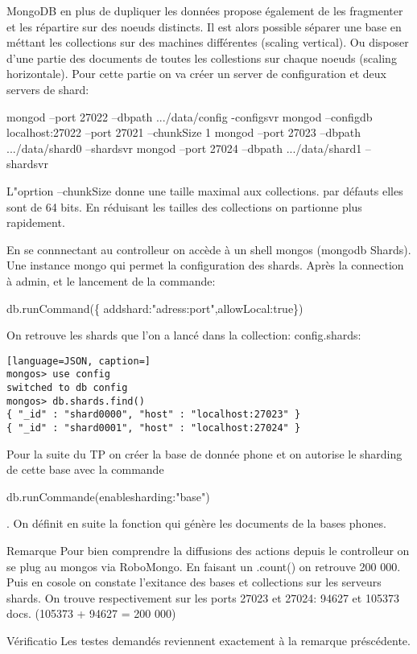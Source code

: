 MongoDB en plus de dupliquer les données propose également de les fragmenter et les répartire sur des noeuds distincts. Il est alors possible séparer une base en méttant les collections sur des machines différentes (scaling vertical). Ou disposer d'une partie des documents de toutes les collestions sur chaque noeuds (scaling horizontale).\newline
Pour cette partie on va créer un server de configuration et deux servers de shard: \newline
\begin{tt}
    mongod --port 27022 --dbpath .../data/config -configsvr \newline
    mongod --configdb localhost:27022 --port 27021 --chunkSize 1 \newline
    mongod --port 27023 --dbpath .../data/shard0 –shardsvr \newline
    mongod --port 27024 --dbpath .../data/shard1 --shardsvr \newline
\end{tt}

    L"oprtion --chunkSize donne une taille maximal aux collections. par défauts elles sont de 64 bits. En réduisant les tailles des collections on partionne plus rapidement.

    En se connnectant au controlleur on accède à un shell mongos (mongodb Shards). Une instance mongo qui permet la configuration des shards. Après la connection à admin, et le lancement de la commande: \newline
    \begin{tt}db.runCommand(\{ addshard:"adress:port",allowLocal:true\})\end{tt} \newline
On retrouve les shards que l'on a lancé dans la collection: config.shards:
\begin{lstlisting}[language=JSON, caption=]
mongos> use config 
switched to db config 
mongos> db.shards.find() 
{ "_id" : "shard0000", "host" : "localhost:27023" }
{ "_id" : "shard0001", "host" : "localhost:27024" }
\end{lstlisting} 

Pour la suite du TP on créer la base de donnée phone et on autorise le sharding de cette base avec la commande \begin{tt}db.runCommande({enablesharding:"base"})\end{tt}. On définit en suite la fonction qui génère les documents de la bases phones. 

\begin{block}{Remarque} Pour bien comprendre la diffusions des actions depuis le controlleur on se plug au mongos via RoboMongo. En faisant un .count() on retrouve 200 000. Puis en cosole on constate l'exitance des bases et collections sur les serveurs shards. On trouve respectivement sur les ports 27023 et 27024: 94627 et 105373 docs.\newline
(105373 + 94627 = 200 000)
\end{block}

\begin{block}{Vérificatio} Les testes demandés reviennent exactement à la remarque préscédente.
\end{block}

